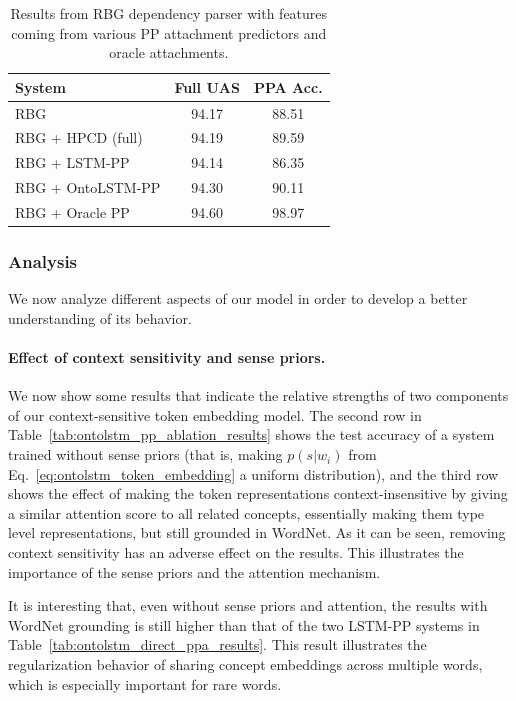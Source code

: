 \begin{table}
    \centering
    \begin{tabular}{lcc}
    \toprule
    \textbf{System} & \textbf{Full UAS} & \textbf{PPA Acc.}\\
    \midrule
    RBG               & 94.17 & 88.51 \\
    RBG + HPCD (full) & 94.19 & 89.59 \\
    RBG + LSTM-PP  & 94.14 & 86.35 \\
    RBG + OntoLSTM-PP & 94.30 & 90.11 \\
    RBG + Oracle PP & 94.60 & 98.97 \\
    \bottomrule
    \end{tabular}
    \caption{Results from RBG dependency parser with features coming from various PP attachment predictors and oracle attachments.}\label{tab:ontolstm_parser_ppa_results}
\end{table}

\subsubsection{Analysis}
\label{sec:ontolstm_pp_analysis}
We now analyze different aspects of our model in order to develop a better understanding of its behavior.

\paragraph{Effect of context sensitivity and sense priors.} We now show some results that indicate the relative strengths of two components of our context-sensitive token embedding model. The second row in Table~\ref{tab:ontolstm_pp_ablation_results} shows the test accuracy of a system trained without sense priors (that is, making $p(s|w_i)$ from Eq.~\ref{eq:ontolstm_token_embedding} a uniform distribution), and the third row shows the effect of making the token representations context-insensitive by giving a similar attention score to all related concepts, essentially making them type level representations, but still grounded in WordNet. As it can be seen, removing context sensitivity has an adverse effect on the results.
This illustrates the importance of the sense priors and the attention mechanism.

It is interesting that, even without sense priors and attention, the results with WordNet grounding is still higher than that of the two LSTM-PP systems in Table~\ref{tab:ontolstm_direct_ppa_results}.
This result illustrates the regularization behavior of sharing concept embeddings across multiple words, which is especially important for rare words.

